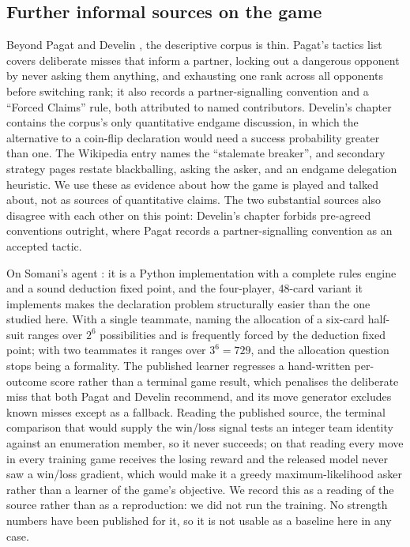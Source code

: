 \documentclass[11pt]{article}
\theoremstyle{definition}
\begin{document}
\subsection{Further informal sources on the game}

Beyond Pagat \cite{pagat} and Develin \cite{develin}, the descriptive corpus
is thin. Pagat's tactics list covers deliberate misses that inform a partner,
locking out a dangerous opponent by never asking them anything, and exhausting
one rank across all opponents before switching rank; it also records a
partner-signalling convention and a ``Forced Claims'' rule, both attributed to
named contributors. Develin's chapter contains the corpus's only quantitative
endgame discussion, in which the alternative to a coin-flip declaration would
need a success probability greater than one. The Wikipedia entry
\cite{wikiliterature} names the ``stalemate breaker'', and secondary strategy
pages \cite{dorsa,strategy-site} restate blackballing, asking the asker, and
an endgame delegation heuristic. We use these as evidence about how the game
is played and talked about, not as sources of quantitative claims. The two
substantial sources also disagree with each other on this point: Develin's
chapter forbids pre-agreed conventions outright, where Pagat records a
partner-signalling convention as an accepted tactic.

On Somani's agent \cite{somani,somani-server}: it is a Python implementation
with a complete rules engine and a sound deduction fixed point, and the
four-player, 48-card variant it implements makes the declaration problem
structurally easier than the one studied here. With a single teammate, naming
the allocation of a six-card half-suit ranges over $2^6$ possibilities and is
frequently forced by the deduction fixed point; with two teammates it ranges
over $3^6 = 729$, and the allocation question stops being a formality. The
published learner regresses a hand-written per-outcome score rather than a
terminal game result, which penalises the deliberate miss that both Pagat and
Develin recommend, and its move generator excludes known misses except as a
fallback. Reading the published source, the terminal comparison that would
supply the win/loss signal tests an integer team identity against an enumeration
member, so it never succeeds; on that reading every move in every training game
receives the losing reward and the released model never saw a win/loss gradient,
which would make it a greedy maximum-likelihood asker rather than a learner of
the game's objective. We record this as a reading of the source rather than as a
reproduction: we did not run the training. No strength numbers have been
published for it, so it is not usable as a baseline here in any case.
\end{document}
